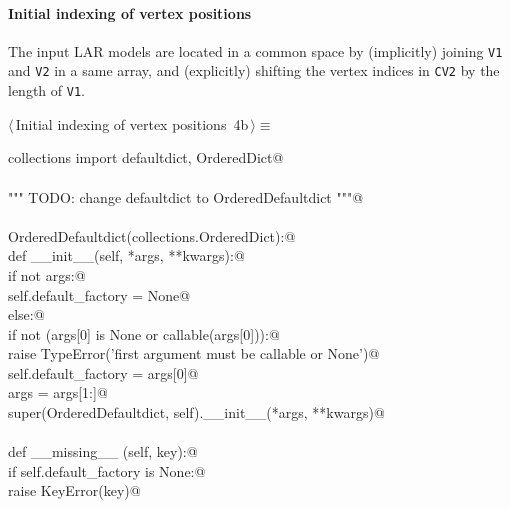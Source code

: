\documentclass[11pt,oneside]{article}	%
\begin{document}
\paragraph{Initial indexing of vertex positions}
The input LAR models are located in a common space by (implicitly) joining \texttt{V1} and \texttt{V2} in a same array, and (explicitly) shifting the vertex indices in \texttt{CV2} by the length of \texttt{V1}.
\begin{flushleft} \small \label{scrap4}
\protect{}$\langle\,$Initial indexing of vertex positions\nobreak\ {\footnotesize 4b}$\,\rangle\equiv$
\vspace{-1ex}
\begin{list}{}{} \item
\mbox{}\verb@from collections import defaultdict, OrderedDict@\\
\mbox{}\verb@@\\
\mbox{}\verb@""" TODO: change defaultdict to OrderedDefaultdict """@\\
\mbox{}\verb@@\\
\mbox{}\verb@class OrderedDefaultdict(collections.OrderedDict):@\\
\mbox{}\verb@    def __init__(self, *args, **kwargs):@\\
\mbox{}\verb@        if not args:@\\
\mbox{}\verb@            self.default_factory = None@\\
\mbox{}\verb@        else:@\\
\mbox{}\verb@            if not (args[0] is None or callable(args[0])):@\\
\mbox{}\verb@                raise TypeError('first argument must be callable or None')@\\
\mbox{}\verb@            self.default_factory = args[0]@\\
\mbox{}\verb@            args = args[1:]@\\
\mbox{}\verb@        super(OrderedDefaultdict, self).__init__(*args, **kwargs)@\\
\mbox{}\verb@@\\
\mbox{}\verb@    def __missing__ (self, key):@\\
\mbox{}\verb@        if self.default_factory is None:@\\
\mbox{}\verb@            raise KeyError(key)@\\

\end{list}
\end{flushleft}
\end{document}

